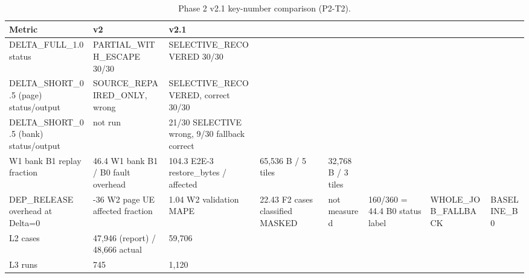 \begin{table}[t]
\centering
\small
\begin{tabular}{p{5.2cm}p{3.5cm}p{5.2cm}}
\toprule
Metric & v2 & v2.1 \\
\midrule
DELTA_FULL_1.0 status & PARTIAL_WITH_ESCAPE 30/30 & SELECTIVE_RECOVERED 30/30 \\
DELTA_SHORT_0.5 (page) status/output & SOURCE_REPAIRED_ONLY, wrong & SELECTIVE_RECOVERED, correct 30/30 \\
DELTA_SHORT_0.5 (bank) status/output & not run & 21/30 SELECTIVE wrong, 9/30 fallback correct \\
W1 bank B1 replay fraction & 46.4%
W1 bank B1 / B0 fault overhead & 104.3%
E2E-3 restore_bytes / affected & 65,536 B / 5 tiles & 32,768 B / 3 tiles \\
DEP_RELEASE overhead at Delta=0 & -36%
W2 page UE affected fraction & 1.04%
W2 validation MAPE & 22.43%
F2 cases classified MASKED & not measured & 160/360 = 44.4%
B0 status label & WHOLE_JOB_FALLBACK & BASELINE_B0 \\
L2 cases & 47,946 (report) / 48,666 actual & 59,706 \\
L3 runs & 745 & 1,120 \\
\bottomrule
\end{tabular}
\caption{Phase 2 v2.1 key-number comparison (P2-T2).}
\end{table}
